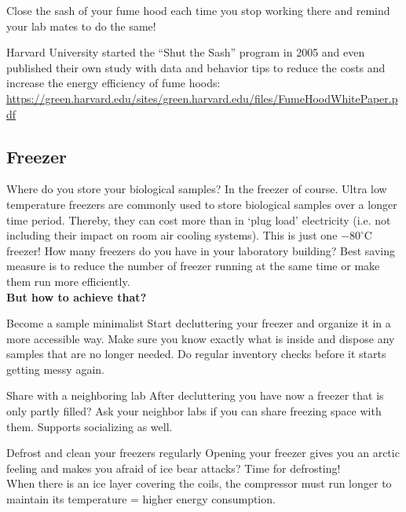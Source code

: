\begin{suggest}{Close the sash of your fume hood each time you stop working there and remind your lab mates to do the same!}
\end{suggest}


Harvard University started the “Shut the Sash” program in 2005 and even published their own study with data and behavior tips to reduce the costs and increase the energy efficiency of fume hoods:   \\ \url{https://green.harvard.edu/sites/green.harvard.edu/files/FumeHoodWhitePaper.pdf}

\subsection{Freezer}
Where do you store your biological samples? In the freezer of course. 
Ultra low temperature freezers are commonly used to store biological samples over a longer time period. Thereby, they can cost more than  in ‘plug load’ electricity (i.e. not including their impact on room air cooling systems). This is just one $-80^\circ \text{C}$ freezer!
How many freezers do you have in your laboratory building? 
Best saving measure is to reduce the number of freezer running at the same time or make them run more efficiently. \\

\textbf{But how to achieve that?  }

\begin{suggest}{Become a sample minimalist}
		Start decluttering your freezer and organize it in a more accessible way. Make sure you know exactly what is inside and dispose any samples that are no longer needed. Do regular inventory checks before it starts getting messy again. 
\end{suggest}

\begin{suggest}{Share with a neighboring lab}
	After decluttering you have now a freezer that is only partly filled? Ask your neighbor labs if you can share freezing space with them. Supports socializing as well.
\end{suggest}

\begin{suggest}{Defrost and clean your freezers regularly}
	Opening your freezer gives you an arctic feeling and makes you afraid of ice bear attacks? Time for defrosting!\\ 
	When there is an ice layer covering the coils, the compressor must run longer to maintain its temperature = higher energy consumption.
\end{suggest}

